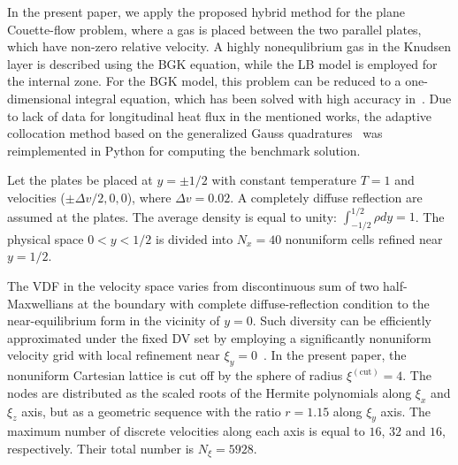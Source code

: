 \documentclass[]{elsarticle} %
\begin{document}
In the present paper, we apply the proposed hybrid method for the plane Couette-flow problem,
where a gas is placed between the two parallel plates, which have non-zero relative velocity.
A highly nonequlibrium gas in the Knudsen layer is described using the BGK equation, while the LB model is employed for the internal zone.
For the BGK model, this problem can be reduced to a one-dimensional integral equation,
which has been solved with high accuracy in~\cite{Luo2015, Luo2016}.
Due to lack of data for longitudinal heat flux in the mentioned works,
the adaptive collocation method based on the generalized Gauss quadratures~\cite{Luo2016}
was reimplemented in Python for computing the benchmark solution.

Let the plates be placed at \(y = \pm 1/2\) with constant temperature \(T = 1\) and velocities (\(\pm\Delta v/2,0,0\)),
where \(\Delta v=0.02\). A completely diffuse reflection are assumed at the plates.
The average density is equal to unity: \(\int_{-1/2}^{1/2}\rho dy=1\).
The physical space \(0 < y < 1/2\) is divided into \(N_x = 40\) nonuniform cells refined near \(y = 1/2\).

The VDF in the velocity space varies from discontinuous sum of two half-Maxwellians at the boundary
with complete diffuse-reflection condition to the near-equilibrium form in the vicinity of \(y=0\).
Such diversity can be efficiently approximated under the fixed DV set by employing
a significantly nonuniform velocity grid with local refinement near \(\xi_y=0\)~\cite{Ohwada1990, Wu2014, Rogozin2016}.
In the present paper, the nonuniform Cartesian lattice is cut off by the sphere of radius \(\xi^{(\mathrm{cut})}=4\).
The nodes are distributed as the scaled roots of the Hermite polynomials along \(\xi_x\) and \(\xi_z\) axis,
but as a geometric sequence with the ratio \(r = 1.15\) along \(\xi_y\) axis.
The maximum number of discrete velocities along each axis is equal to \(16\), \(32\) and \(16\), respectively.
Their total number is \(N_\xi=5928\).
\end{document}

